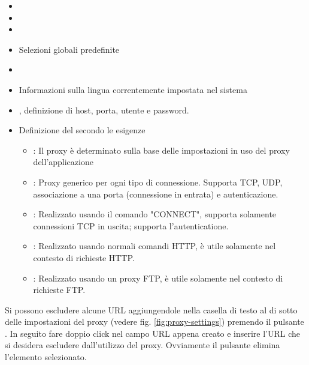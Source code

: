 
\begin{itemize}
\item {} 
\item {}
\item {}
\item Selezioni globali predefinite
\end{itemize}


\begin{itemize}
\item {}
\item Informazioni sulla lingua correntemente impostata nel sistema
\end{itemize}


\begin{itemize}
\item {}, definizione di host,
porta, utente e password.
\item Definizione del  secondo le esigenze
 \begin{itemize}
  \item {}: Il proxy è determinato sulla base delle impostazioni in uso del proxy dell'applicazione
  \item {}: Proxy generico per ogni tipo di connessione. Supporta TCP, UDP, associazione a una porta (connessione in entrata) e autenticazione.
  \item {}: Realizzato usando il comando "CONNECT", supporta solamente connessioni TCP in uscita; supporta l'autenticatione.
  \item {}: Realizzato usando normali comandi HTTP, è utile solamente nel contesto di richieste HTTP.
  \item {}: Realizzato usando un proxy FTP, è utile solamente nel contesto di richieste FTP.
 \end{itemize}
\end{itemize}

Si possono escludere alcune URL aggiungendole nella casella di testo al di sotto delle impostazioni del proxy (vedere
fig. \ref{fig:proxy-settings}) premendo il pulsante . In seguito 
fare doppio click nel campo URL appena creato e inserire l'URL che si desidera
escludere dall'utilizzo del proxy. Ovviamente il pulsante  elimina
l'elemento selezionato.

